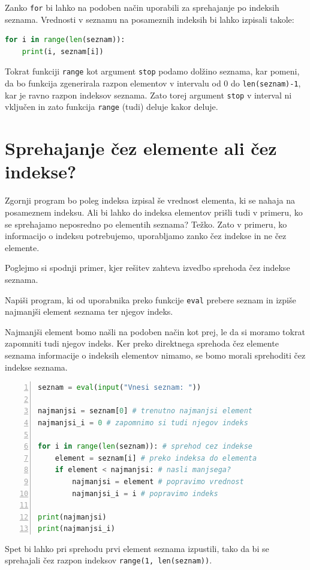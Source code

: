 Zanko \texttt{for} bi lahko na podoben način uporabili za sprehajanje po indeksih seznama. Vrednosti v seznamu na posameznih indeksih bi lahko izpisali takole:
\begin{lstlisting}[language=Python]
for i in range(len(seznam)):
    print(i, seznam[i])
\end{lstlisting}
Tokrat funkciji \texttt{range} kot argument \texttt{stop} podamo dolžino seznama, kar pomeni, da bo funkcija zgenerirala razpon elementov v intervalu od 0 do \texttt{len(seznam)-1}, kar je ravno razpon indeksov seznama. Zato torej argument \texttt{stop} v interval ni vključen in zato funkcija \texttt{range} (tudi) deluje kakor deluje.

\section{Sprehajanje čez elemente ali čez indekse?}
Zgornji program bo poleg indeksa izpisal še vrednost elementa, ki se nahaja na posameznem indeksu. Ali bi lahko do indeksa elementov prišli tudi v primeru, ko se sprehajamo neposredno po elementih seznama? Težko. Zato v primeru, ko informacijo o indeksu potrebujemo, uporabljamo zanko čez indekse in ne čez elemente.  

Poglejmo si spodnji primer, kjer rešitev zahteva izvedbo sprehoda čez indekse seznama.
\begin{zgled}
Napiši program, ki od uporabnika preko funkcije \texttt{eval} prebere seznam in izpiše najmanjši element seznama ter njegov indeks. 
\end{zgled}
\begin{resitev}
Najmanjši element bomo našli na podoben način kot prej, le da si moramo tokrat zapomniti tudi njegov indeks. Ker preko direktnega sprehoda čez elemente seznama informacije o indeksih elementov nimamo, se bomo morali sprehoditi čez indekse seznama.
\begin{lstlisting}[language=Python,numbers=left]
seznam = eval(input("Vnesi seznam: "))

najmanjsi = seznam[0] # trenutno najmanjsi element
najmanjsi_i = 0 # zapomnimo si tudi njegov indeks

for i in range(len(seznam)): # sprehod cez indekse
    element = seznam[i] # preko indeksa do elementa
    if element < najmanjsi: # nasli manjsega?
        najmanjsi = element # popravimo vrednost
        najmanjsi_i = i # popravimo indeks

print(najmanjsi)
print(najmanjsi_i)
\end{lstlisting}
Spet bi lahko pri sprehodu prvi element seznama izpustili, tako da bi se sprehajali čez razpon indeksov \texttt{range(1, len(seznam))}.
\end{resitev}

